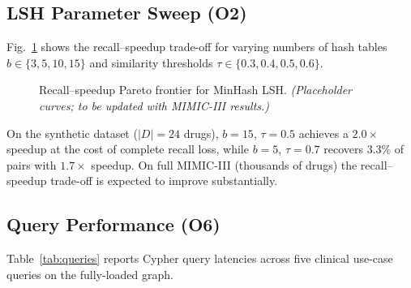 \documentclass[conference]{IEEEtran}
\begin{document}
\subsection{LSH Parameter Sweep (O2)}

Fig.~\ref{fig:lsh} shows the recall--speedup trade-off for varying numbers
of hash tables $b \in \{3, 5, 10, 15\}$ and similarity thresholds
$\tau \in \{0.3, 0.4, 0.5, 0.6\}$.

\begin{figure}[htbp]
\centering
{}
\caption{Recall--speedup Pareto frontier for MinHash LSH. \textit{(Placeholder
curves; to be updated with MIMIC-III results.)}}
\label{fig:lsh}
\end{figure}

On the synthetic dataset ($|D|=24$ drugs), $b=15$, $\tau=0.5$ achieves a
$2.0\times$ speedup at the cost of complete recall loss, while
$b=5$, $\tau=0.7$ recovers 3.3\% of pairs with $1.7\times$ speedup.
On full MIMIC-III (thousands of drugs) the recall--speedup trade-off is
expected to improve substantially.

\subsection{Query Performance (O6)}

Table~\ref{tab:queries} reports Cypher query latencies across five clinical
use-case queries on the fully-loaded graph.
\end{document}
